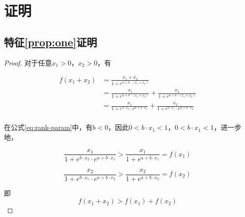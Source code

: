 \section{证明}
\subsection{特征\ref{prop:one}证明}
\begin{proof}
\label{proof:one}
对于任意$x_1>0$，$x_2>0$，有

\[
\begin{aligned}
f(x_1+x_2)&=\frac{x_1+x_2}{1+e^{a+b\cdot (x_1+x_2)}}\\
&=\frac{x_1}{1+e^{a+b\cdot (x_1+x_2)}}+\frac{x_2}{1+e^{a+b\cdot (x_1+x_2)}}\\
&=\frac{x_1}{1+e^{b\cdot x_2}\cdot e^{a+b\cdot {x_1}}}+\frac{x_2}{1+e^{b\cdot x_1}\cdot e^{a+b\cdot {x_2}}}\\
\end{aligned}
\]

在公式\ref{eq:rank-param}中，有$b<0$，因此$0<b\cdot x_1<1$，$0<b\cdot x_1<1$，进一步地，

\[
\frac{x_1}{1+e^{b\cdot x_2}\cdot e^{a+b\cdot {x_1}}}>\frac{x_1}{1+ e^{a+b\cdot {x_1}}}=f(x_1)
\]

\[
\frac{x_2}{1+e^{b\cdot x_1}\cdot e^{a+b\cdot {x_2}}}>\frac{x_2}{1+ e^{a+b\cdot {x_2}}}=f(x_2)
\]

即
\[
f(x_1+x_2)>f(x_1)+f(x_2)
\]
\end{proof}

